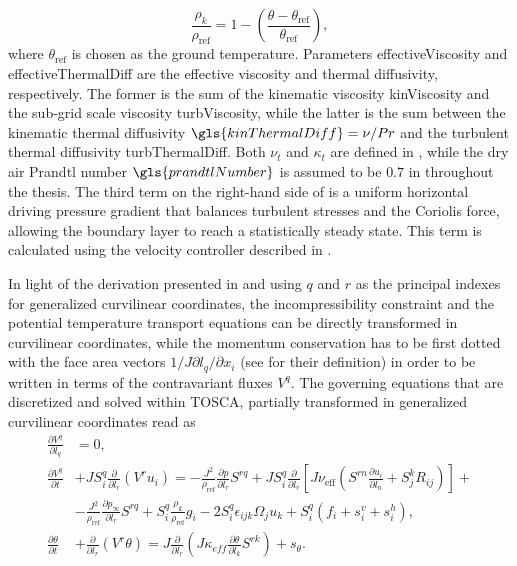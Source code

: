 \begin{equation}
	\frac{\rho_k}{\rho_\text{ref}} = 1 - \left(\frac{\theta-\theta_\text{ref}}{\theta_\text{ref}}\right), \label{eq:modifiedDensity}
\end{equation}
where $\theta_\text{ref}$ is chosen as the ground temperature. Parameters \gls{effectiveViscosity} and \gls{effectiveThermalDiff} are the effective viscosity and thermal diffusivity, respectively. The former is the sum of the kinematic viscosity \gls{kinViscosity} and the sub-grid scale viscosity \gls{turbViscosity}, while the latter is the sum between the kinematic thermal diffusivity $\gls{kinThermalDiff} = \nu/Pr$ and the turbulent thermal diffusivity \gls{turbThermalDiff}. Both $\nu_t$ and $\kappa_t$ are defined in , while the dry air Prandtl number $\gls{prandtlNumber}$ is assumed to be $0.7$ in throughout the thesis. The third term on the right-hand side of  is a uniform horizontal driving pressure gradient that balances turbulent stresses and the Coriolis force, allowing the boundary layer to reach a statistically steady state. This term is calculated using the velocity controller described in . 

In light of the derivation presented in  and using $q$ and $r$ as the principal indexes for generalized curvilinear coordinates, the incompressibility constraint and the potential temperature transport equations can be directly transformed in curvilinear coordinates, while the momentum conservation has to be first dotted with the face area vectors $1/J\partial l_q/\partial x_i$ (see  for their definition) in order to be written in terms of the contravariant fluxes $V^q$. The governing equations that are discretized and solved within TOSCA, partially transformed in generalized curvilinear coordinates read as
\begin{align}
	\frac{\partial V^q}{\partial l_q} &= 0, \label{eq:massCurvilinear} \\
	\frac{\partial V^q}{\partial t} &+ JS^q_i \frac{\partial}{\partial l_r}\left(V^r u_i\right) = -\frac{J^2}{\rho_\text{ref}}\frac{\partial p}{\partial l_r}S^{rq} + JS^q_i  \frac{\partial}{\partial l_r}\left[J\nu_\text{eff}\left(S^{rn}\frac{\partial u_i}{\partial l_n} + S^k_jR_{ij}\right)\right] + \nonumber \\
	&- \frac{J^2}{\rho_\text{ref}}\frac{\partial p_{\infty}}{\partial l_r}S^{rq} + S^q_i\frac{\rho_k}{\rho_\text{ref}}g_i - 2S^q_i\epsilon_{ijk}\Omega_j u_k + S^q_i\left(f_i + s^v_i + s^h_i\right), \label{eq:momentumCurvilinear} \\
	\frac{\partial \theta}{\partial t} &+ \frac{\partial}{\partial l_r}\left(V^r \theta\right) = J\frac{\partial}{\partial l_r}\left(J\kappa_{eff}\frac{\partial \theta}{\partial l_k} S^{rk}\right) + s_\theta. \label{eq:temperatureCurvilinear}
\end{align}

